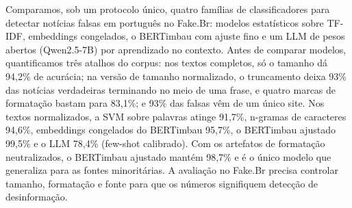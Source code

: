 \maketitle

\begin{resumo}
Comparamos, sob um protocolo único, quatro famílias de classificadores para detectar notícias falsas em português no Fake.Br: modelos estatísticos sobre TF-IDF, embeddings congelados, o BERTimbau com ajuste fino e um LLM de pesos abertos (Qwen2.5-7B) por aprendizado no contexto. Antes de comparar modelos, quantificamos três atalhos do corpus: nos textos completos, só o tamanho dá 94,2\% de acurácia; na versão de tamanho normalizado, o truncamento deixa 93\% das notícias verdadeiras terminando no meio de uma frase, e quatro marcas de formatação bastam para 83,1\%; e 93\% das falsas vêm de um único site. Nos textos normalizados, a SVM sobre palavras atinge 91,7\%, n-gramas de caracteres 94,6\%, embeddings congelados do BERTimbau 95,7\%, o BERTimbau ajustado 99,5\% e o LLM 78,4\% (few-shot calibrado). Com os artefatos de formatação neutralizados, o BERTimbau ajustado mantém 98,7\% e é o único modelo que generaliza para as fontes minoritárias. A avaliação no Fake.Br precisa controlar tamanho, formatação e fonte para que os números signifiquem detecção de desinformação.
\end{resumo}

\begin{abstract}
We compare, under a single protocol, four families of classifiers for Portuguese fake news detection on Fake.Br: TF-IDF statistical models, frozen embeddings, fine-tuned BERTimbau, and an open-weight LLM (Qwen2.5-7B) with in-context learning. Before comparing models, we quantify three corpus shortcuts: on full texts, length alone yields 94.2\% accuracy; in the size-normalized version, truncation leaves 93\% of true articles ending mid-sentence and four formatting cues reach 83.1\%; and 93\% of fake articles come from a single website. On normalized texts, a word-level SVM reaches 91.7\%, character n-grams 94.6\%, frozen BERTimbau 95.7\%, fine-tuned BERTimbau 99.5\%, and the LLM 78.4\% (calibrated few-shot). With formatting artifacts neutralized, fine-tuned BERTimbau keeps 98.7\% and is the only model that generalizes to minority sources. Evaluation on Fake.Br must control for length, formatting, and source for the numbers to reflect misinformation detection.
\end{abstract}


